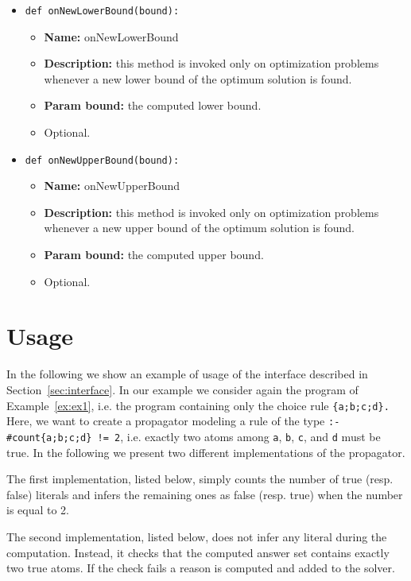 \documentclass[a4paper,12pt]{article}
\begin{document}
\begin{itemize}
		\item \texttt{def onNewLowerBound(bound):}
		\begin{itemize}
			\item \textbf{Name:} onNewLowerBound
			\item \textbf{Description:} this method is invoked only on optimization problems whenever a new lower bound of the optimum solution is found.
			\item \textbf{Param bound:} the computed lower bound.
			\item Optional.
		\end{itemize}
		
		\item \texttt{def onNewUpperBound(bound):}
		\begin{itemize}
			\item \textbf{Name:} onNewUpperBound
			\item \textbf{Description:} this method is invoked only on optimization problems whenever a new upper bound of the optimum solution is found.
			\item \textbf{Param bound:} the computed upper bound.
			\item Optional.
		\end{itemize}
		
	\end{itemize}
	
	\section{Usage}
	In the following we show an example of usage of the interface described in Section~\ref{sec:interface}.
	In our example we consider again the program of Example~\ref{ex:ex1}, i.e. the program containing only the choice rule \verb|{a;b;c;d}.|
	Here, we want to create a propagator modeling a rule of the type \verb|:- #count{a;b;c;d} != 2|, i.e. exactly two atoms among \verb|a|, \verb|b|, \verb|c|, and \verb|d| must be true.
	In the following we present two different implementations of the propagator.
	
	The first implementation, listed below, simply counts the number of true (resp. false) literals and infers the remaining ones as false (resp. true) when the number is equal to 2.
	
	
	The second implementation, listed below, does not infer any literal during the computation.
	Instead, it checks that the computed answer set contains exactly two true atoms.
	If the check fails a reason is computed and added to the solver.
	
	
\end{document}
